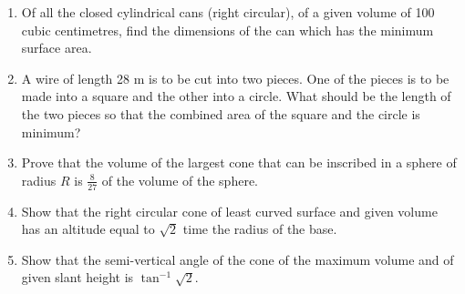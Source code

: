 \begin{enumerate}[label=\arabic*.,ref=\thesubsection.\theenumi]
\item  Of all the closed cylindrical cans (right circular), of a given volume of 100 cubic centimetres, find the dimensions of the can which has the minimum surface area.
\item  A wire of length 28 m is to be cut into two pieces. One of the pieces is to be made into a square and the other into a circle. What should be the length of the two pieces so that the combined area of the square and the circle is minimum?
\item  Prove that the volume of the largest cone that can be inscribed in a sphere of radius $R$ is
$\frac{8}{ 27}$ of the volume of the sphere.
\item  Show that the right circular cone of least curved surface and given volume has an altitude equal to $\sqrt{2}$ time the radius of the base.
\item  Show that the semi-vertical angle of the cone of the maximum volume and of given slant height is
$\tan^{-1} \sqrt{2}$.


\end{enumerate}

